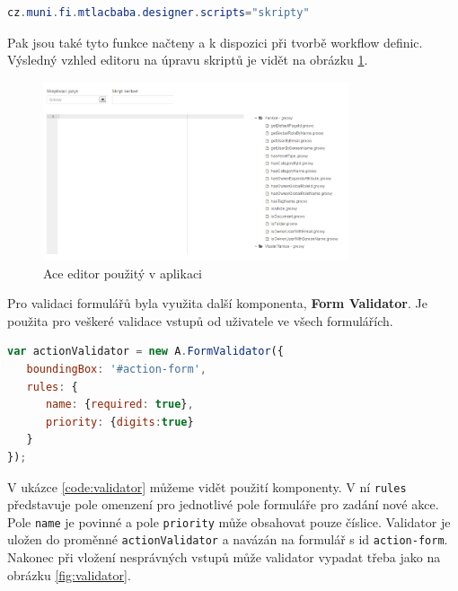 \documentclass{fithesis}
\begin{document}
\begin{lstlisting}[language=Java , caption = Definovaná cesta ke skriptům , label =code:cesta] 
cz.muni.fi.mtlacbaba.designer.scripts="skripty"
\end{lstlisting} 


Pak jsou také tyto funkce načteny a k dispozici při tvorbě workflow definic. Výsledný vzhled editoru na úpravu skriptů je vidět na obrázku \ref{fig:ace_editor}.
 
\begin{figure}[htp]
\centering
\includegraphics[width=340px]{images/ace_editor.png}
\caption{Ace editor použitý v aplikaci}
\label{fig:ace_editor}
\end{figure}

Pro validaci formulářů byla využita další komponenta, \textbf{Form Validator}. Je použita pro veškeré validace vstupů od uživatele ve všech formulářích.

\begin{lstlisting}[language=JavaScript , caption = Použítí komponenty Form Validator , label = code:validator]
var actionValidator = new A.FormValidator({
   boundingBox: '#action-form', 
   rules: {
      name: {required: true},
      priority: {digits:true}
   }
});
\end{lstlisting}

V ukázce \ref{code:validator} můžeme vidět použití komponenty. V ní \verb|rules| představuje pole omenzení pro jednotlivé pole formuláře pro zadání nové akce. Pole \verb|name| je povinné a pole \verb|priority| může obsahovat pouze číslice. Validator je uložen do proměnné \verb|actionValidator| a navázán na formulář s id \verb|action-form|. Nakonec při vložení nesprávných vstupů může validator vypadat třeba jako na obrázku \ref{fig:validator}.
\end{document}
